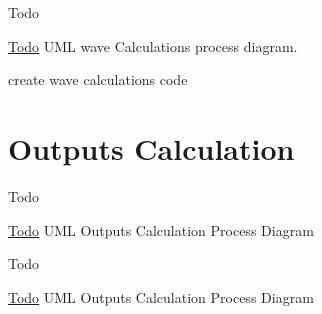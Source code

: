 \begin{DoxyRefDesc}{Todo}
\item[\hyperlink{todo__todo000022}{Todo}]U\-M\-L wave Calculations process diagram. 

create wave calculations code\end{DoxyRefDesc}
\hypertarget{UML_OutputsCalculation}{}\section{Outputs Calculation}\label{UML_OutputsCalculation}
\begin{DoxyRefDesc}{Todo}
\item[\hyperlink{todo__todo000005}{Todo}]U\-M\-L Outputs Calculation Process Diagram\end{DoxyRefDesc}


\begin{DoxyRefDesc}{Todo}
\item[\hyperlink{todo__todo000017}{Todo}]U\-M\-L Outputs Calculation Process Diagram\end{DoxyRefDesc}
